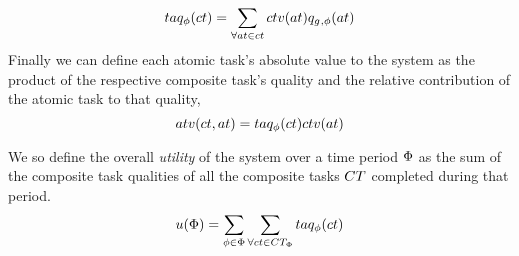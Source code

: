 \begin{equation}
\functionCompositeTaskQuality{}{} = \sum\limits_{\forall \varAtomicTask{}{} \in \varCompositeTask{}{}}
\functionCompositeTaskValue{}{}\functionAtomicTaskQualitySignature{}{}	
\end{equation}
Finally we can define each atomic task's absolute value to the system as the product of the respective composite task's quality and the relative contribution of the atomic task to that quality,
\begin{equation}
	\functionTaskAbsoluteValue{}{} = 
	\functionCompositeTaskQuality{}{}\functionCompositeTaskValue{}{}
\end{equation}

We so define the overall \textit{ utility} of the system over a time period $\Phi$ as the sum of the composite task qualities of all the composite tasks $\setCompositeTask{}{}$ completed during that period.
	\begin{equation}
		\label{eq:system_utility}
		\functionSystemUtility{}{} = \sum\limits_{\varTime{}{} \in \setTime{}{}}
		\sum\limits_{\forall \varCompositeTask{}{} \in \setCompositeTask{\setTime{}{}}{}}
		\functionCompositeTaskQuality{}{}
	\end{equation}